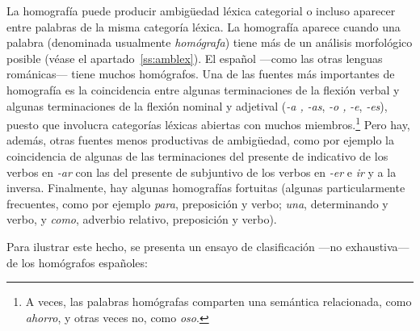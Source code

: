La homografía puede producir ambigüedad léxica categorial o incluso aparecer entre palabras de la misma categoría léxica. La homografía aparece cuando una palabra (denominada usualmente \emph{homógrafa}) tiene más de un análisis morfológico posible (véase el apartado~\ref{ss:amblex}). El español ---como las otras lenguas románicas--- tiene muchos homógrafos. Una de las fuentes más importantes de homografía es la coincidencia entre algunas terminaciones de la flexión verbal y algunas terminaciones de la flexión nominal y adjetival (\emph{-a ,} \emph{-as}, \emph{-o ,} \emph{-e}, \emph{-es}), puesto que involucra categorías léxicas abiertas con muchos miembros.\footnote{A veces, las palabras homógrafas comparten una semántica relacionada, como \emph{ahorro}, y otras veces no, como \emph{oso}.} Pero hay, además, otras fuentes menos productivas de ambigüedad, como por ejemplo la coincidencia de algunas de las terminaciones del presente de indicativo de los verbos en \emph{-ar} con las del presente de subjuntivo de los verbos en \emph{-er} e \emph{ir} y a la inversa. Finalmente, hay algunas homografías fortuitas (algunas particularmente frecuentes, como por ejemplo \emph{para}, preposición y verbo; \emph{una}, determinando y verbo, y \emph{como}, adverbio relativo, preposición y verbo). 

Para ilustrar este hecho, se presenta un ensayo de clasificación ---no exhaustiva--- de los homógrafos españoles: 

